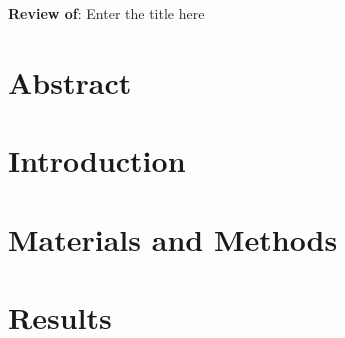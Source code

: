 \documentclass[11pt]{article}
\begin{document}
{\Large \textbf{Review of}: \<Enter the title here\>}

\section*{Abstract}





\section*{Introduction}






\section*{Materials and Methods}








\section*{Results}
\end{document}
